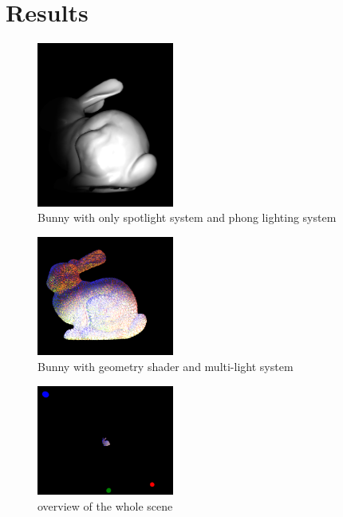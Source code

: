 \documentclass[acmtog]{acmart}
\begin{document}
\section{Results}
\begin{figure}[h]
    \centering
    \includegraphics[width=0.4\textwidth]{bunny_with_spotlight_only}
    \caption{Bunny with only spotlight system and phong lighting system}
\end{figure}


\begin{figure}[h]
    \centering
    \includegraphics[width=0.4\textwidth]{bunny_with_geometry_multi_spot}
    \caption{Bunny with geometry shader and multi-light system}
\end{figure}

\begin{figure}[h]
    \centering
    \includegraphics[width=0.4\textwidth]{overview}
    \caption{overview of the whole scene}
\end{figure}
\end{document}

